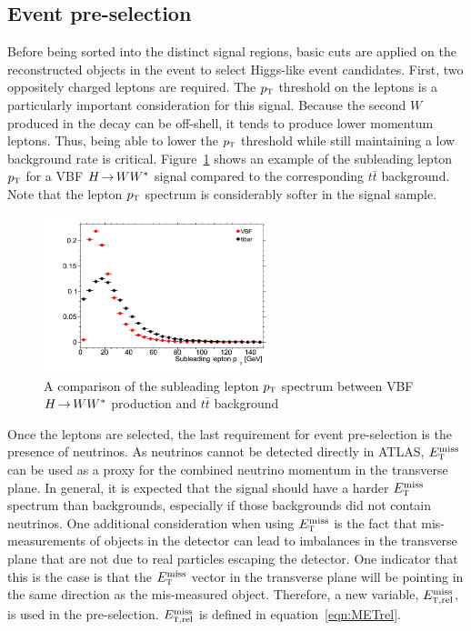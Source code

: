 \subsection{Event pre-selection}

Before being sorted into the distinct signal regions, basic cuts are applied on the reconstructed objects in the event to select Higgs-like event candidates. First, two oppositely charged leptons are required. The $p_{\textrm{\footnotesize\sc t}}$ threshold on the leptons is a particularly important consideration for this signal. Because the second $W$ produced in the decay can be off-shell, it tends to produce lower momentum leptons. Thus, being able to lower the $p_{\textrm{\footnotesize\sc t}}$ threshold while still maintaining a low background rate is critical. Figure~\ref{fig:leptonpt} shows an example of the subleading lepton $p_{\textrm{\footnotesize\sc t}}$ for a VBF $H{\,{\rightarrow}\,}WW^\ast$ signal compared to the corresponding $t\bar{t}$ background. Note that the lepton $p_{\textrm{\footnotesize\sc t}}$ spectrum is considerably softer in the signal sample. 

\begin{figure}[h!]
  \centering
  \captionsetup{justification=centering}

  \includegraphics[width=0.6\textwidth]{figures/lepton_pt}
  \caption{A comparison of the subleading lepton $p_{\textrm{\footnotesize\sc t}}$ spectrum between VBF $H{\,{\rightarrow}\,}WW^\ast$ production and $t\bar{t}$ background}
  \label{fig:leptonpt}
\end{figure}

Once the leptons are selected, the last requirement for event pre-selection is the presence of neutrinos. As neutrinos cannot be detected directly in ATLAS, $E_{\textrm{\footnotesize\sc t}}^{\rm miss}$ can be used as a proxy for the combined neutrino momentum in the transverse plane. In general, it is expected that the signal should have a harder $E_{\textrm{\footnotesize\sc t}}^{\rm miss}$ spectrum than backgrounds, especially if those backgrounds did not contain neutrinos. One additional consideration when using $E_{\textrm{\footnotesize\sc t}}^{\rm miss}$ is the fact that mis-measurements of objects in the detector can lead to imbalances in the transverse plane that are not due to real particles escaping the detector. One indicator that this is the case is that the $E_{\textrm{\footnotesize\sc t}}^{\rm miss}$ vector in the transverse plane will be pointing in the same direction as the mis-measured object. Therefore, a new variable, $E_{{\textrm{\footnotesize\sc t}},{\rm rel}}^{\rm miss}$, is used in the pre-selection. $E_{{\textrm{\footnotesize\sc t}},{\rm rel}}^{\rm miss}$ is defined in equation~\ref{eqn:METrel}. 

